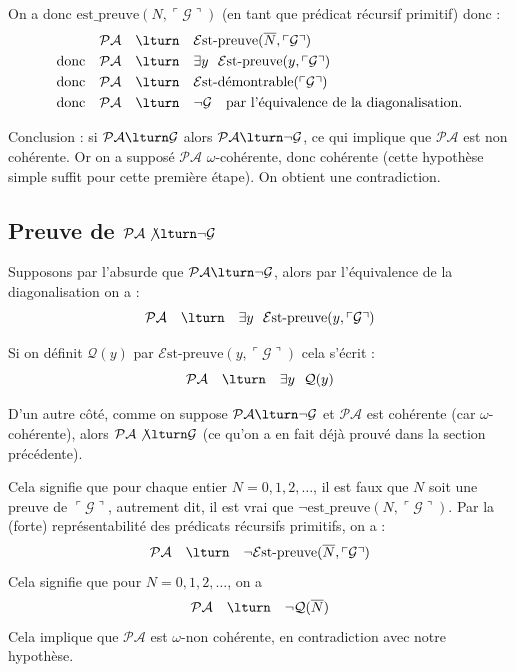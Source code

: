 \documentclass[11pt,class=report,crop=false]{standalone}
\begin{document}
On a donc $\text{est\_preuve}(N, \ulcorner \mathcal{G} \urcorner)$ (en tant que prédicat récursif primitif) donc :
\begin{align*}
    & \mathcal{PA} \quad \lturn \quad \mathcal{E}\text{st-preuve}(\overline{N}, \ulcorner \mathcal{G} \urcorner) \\
    \text{donc} \quad & \mathcal{PA} \quad \lturn \quad \exists y \ \ \mathcal{E}\text{st-preuve}(y, \ulcorner \mathcal{G} \urcorner) \\
    \text{donc} \quad & \mathcal{PA} \quad \lturn \quad \mathcal{E}\text{st-démontrable}(\ulcorner \mathcal{G} \urcorner) \\
    \text{donc} \quad & \mathcal{PA} \quad \lturn \quad \lnot \mathcal{G} \quad \text{par l'équivalence de la diagonalisation.}
\end{align*}

Conclusion : si $\mathcal{PA} \lturn \mathcal{G}$ alors $\mathcal{PA} \lturn \lnot \mathcal{G}$, ce qui implique que $\mathcal{PA}$ est non cohérente. Or on a supposé $\mathcal{PA}$ $\omega$-cohérente, donc cohérente (cette hypothèse simple suffit pour cette première étape). On obtient une contradiction.


\subsection{Preuve de $\mathcal{PA} \not\lturn \lnot\mathcal{G}$}

Supposons par l'absurde que $\mathcal{PA} \lturn \lnot\mathcal{G}$, alors par l'équivalence de la diagonalisation on a :
\[
  \mathcal{PA} \quad \lturn \quad \exists y \ \ \mathcal{E}\text{st-preuve}(y, \ulcorner \mathcal{G} \urcorner)
\]

Si on définit $\mathcal{Q}(y)$ par $\mathcal{E}\text{st-preuve}(y, \ulcorner \mathcal{G} \urcorner)$ cela s'écrit :
\[
\mathcal{PA} \quad \lturn \quad \exists y \ \ \mathcal{Q}(y)
\]

\medskip

D'un autre côté, comme on suppose $\mathcal{PA} \lturn \lnot\mathcal{G}$ et 
$\mathcal{PA}$ est cohérente (car $\omega$-cohérente), alors $\mathcal{PA} \not\lturn \mathcal{G}$ (ce qu'on a en fait déjà prouvé dans la section précédente).

Cela signifie que pour chaque entier $N=0,1,2,\dots$, il est faux que $N$ soit une preuve de $\ulcorner \mathcal{G} \urcorner$, autrement dit, il est vrai que 
$\lnot \text{est\_preuve}(N, \ulcorner\mathcal{G}\urcorner)$. Par la (forte) représentabilité des prédicats récursifs primitifs, on a :
\[
  \mathcal{PA} \quad \lturn \quad \lnot\mathcal{E}\text{st-preuve}(\overline{N}, \ulcorner \mathcal{G} \urcorner)
\]
Cela signifie que pour $N=0,1,2,\dots$, on a 
\[
  \mathcal{PA} \quad \lturn \quad  \lnot\mathcal{Q}(\overline{N})
\]
Cela implique que $\mathcal{PA}$ est $\omega$-non cohérente, en contradiction avec notre hypothèse.
\end{document}
